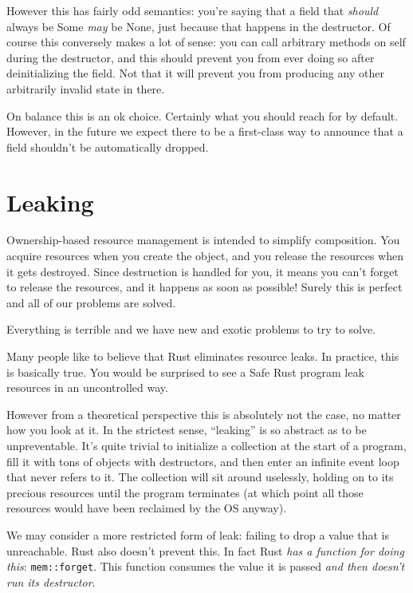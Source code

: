 \documentclass[a4paper,]{book}
\begin{document}
However this has fairly odd semantics: you're saying that a field that
\emph{should} always be Some \emph{may} be None, just because that
happens in the destructor. Of course this conversely makes a lot of
sense: you can call arbitrary methods on self during the destructor, and
this should prevent you from ever doing so after deinitializing the
field. Not that it will prevent you from producing any other arbitrarily
invalid state in there.

On balance this is an ok choice. Certainly what you should reach for by
default. However, in the future we expect there to be a first-class way
to announce that a field shouldn't be automatically dropped.

\hypertarget{sec--leaking}{\section{Leaking}\label{sec--leaking}}

Ownership-based resource management is intended to simplify composition.
You acquire resources when you create the object, and you release the
resources when it gets destroyed. Since destruction is handled for you,
it means you can't forget to release the resources, and it happens as
soon as possible! Surely this is perfect and all of our problems are
solved.

Everything is terrible and we have new and exotic problems to try to
solve.

Many people like to believe that Rust eliminates resource leaks. In
practice, this is basically true. You would be surprised to see a Safe
Rust program leak resources in an uncontrolled way.

However from a theoretical perspective this is absolutely not the case,
no matter how you look at it. In the strictest sense, ``leaking'' is so
abstract as to be unpreventable. It's quite trivial to initialize a
collection at the start of a program, fill it with tons of objects with
destructors, and then enter an infinite event loop that never refers to
it. The collection will sit around uselessly, holding on to its precious
resources until the program terminates (at which point all those
resources would have been reclaimed by the OS anyway).

We may consider a more restricted form of leak: failing to drop a value
that is unreachable. Rust also doesn't prevent this. In fact Rust
\emph{has a function for doing this}: \texttt{mem::forget}. This
function consumes the value it is passed \emph{and then doesn't run its
destructor}.
\end{document}

